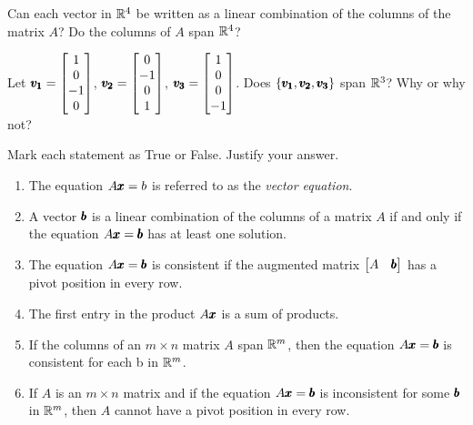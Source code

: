 \documentclass{../mathhomework}
\newenvironment{Mat}{\begin{bmatrix}}{\end{bmatrix}}
\begin{document}
\begin{problem}[1.4\#19]
    Can each vector in $\mathbb{R}^4$ be written as a linear combination of the columns of the matrix $A$? Do the columns of $A$ span $\mathbb{R}^4$?
\end{problem}

\begin{problem}[1.4\#21]
    Let $\Vect{v_1} = \begin{Mat}
        1 \\ 0 \\ -1 \\ 0
    \end{Mat}$, $\Vect{v_2} = \begin{Mat}
        0 \\ -1 \\ 0 \\ 1
    \end{Mat}$, $\Vect{v_3} = \begin{Mat}
        1 \\ 0 \\ 0 \\ -1
    \end{Mat}$. Does $\{\pmb{v_1}, \pmb{v_2}, \pmb{v_3}\}$ span $\mathbb{R}^3$? Why or why not?
\end{problem}

\begin{problem}[1.4\#25]
    Mark each statement as True or False. Justify your answer.

    \begin{enumerate}[label=(\alph*)]
        \item The equation $A\pmb{x} = b$ is referred to as the \textit{vector equation}.
        \item A vector $\pmb{b}$ is a linear combination of the columns of a matrix $A$ if and only if the equation $A\pmb{x} = \pmb{b}$ has at least one solution.
        \item The equation $A\pmb{x} = \pmb{b}$ is consistent if the augmented matrix $\begin{Mat}
            A & \Vect{b}
        \end{Mat}$ has a pivot position in every row.
        \item The first entry in the product $A\pmb{x}$ is a sum of products.
        \item If the columns of an $m \times n$ matrix $A$ span $\mathbb{R}^m$, then the equation $A\pmb{x} = \pmb{b}$ is consistent for each b in $\mathbb{R}^m$.
        \item If $A$ is an $m \times n$ matrix and if the equation $A\pmb{x} = \pmb{b}$ is inconsistent for some $\pmb{b}$ in $\mathbb{R}^m$, then $A$ cannot have a pivot position in every row.
    \end{enumerate}
\end{problem}
\end{document}
